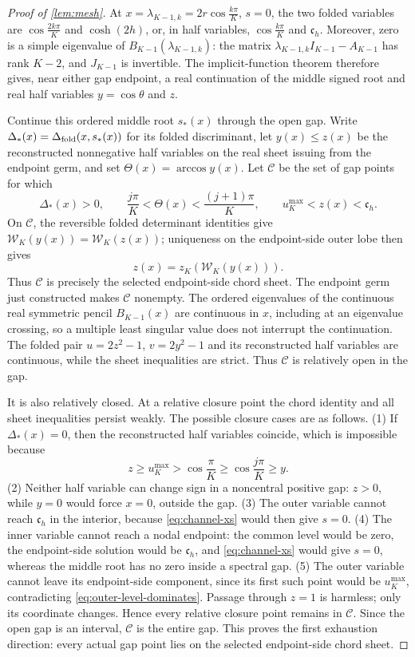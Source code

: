 \documentclass[review,hidelinks,onefignum,onetabnum]{siamart251216}
\begin{document}
\begin{proof}[Proof of \cref{lem:mesh}]
At \(x=\lambda_{K-1,k}=2r\cos\frac{k\pi}{K}\), \(s=0\), the two
folded variables are \(\cos\frac{2k\pi}{K}\) and
\(\cosh(2h)\), or, in half variables, \(\cos\frac{k\pi}{K}\) and
\(\mathfrak c_h\).  Moreover, zero is a simple eigenvalue of
\(B_{K-1}(\lambda_{K-1,k})\): the matrix
\(\lambda_{K-1,k}I_{K-1}-A_{K-1}\) has rank \(K-2\), and \(J_{K-1}\) is
invertible.  The implicit-function theorem therefore gives, near either
gap endpoint, a real continuation of the middle signed root and real
half variables \(y=\cos\theta\) and \(z\).

Continue this ordered middle root \(s_*(x)\) through the open gap.  Write
\(\Delta_*(x)=\Delta_{\rm fold}(x,s_*(x))\) for its folded discriminant,
let \(y(x)\leq z(x)\) be the reconstructed nonnegative half variables on
the real sheet issuing from the endpoint germ, and set
\(\Theta(x)=\arccos y(x)\).  Let \(\mathcal C\) be the set of gap points for
which
\[
 \Delta_*(x)>0,\qquad
 \frac{j\pi}{K}<\Theta(x)<\frac{(j+1)\pi}{K},\qquad
 u_K^{\max}<z(x)<\mathfrak c_h.
\]
On \(\mathcal C\), the reversible folded determinant identities give
\(\mathcal W_K(y(x))=\mathcal W_K(z(x))\); uniqueness on the endpoint-side
outer lobe then gives
\[
 z(x)=z_K(\mathcal W_K(y(x))).
\]
Thus \(\mathcal C\) is precisely the selected endpoint-side chord sheet.
The endpoint germ just constructed makes \(\mathcal C\) nonempty.  The
ordered eigenvalues of the continuous real symmetric pencil \(B_{K-1}(x)\)
are continuous in \(x\), including at an eigenvalue crossing, so a multiple
least singular value does not interrupt the continuation.  The folded pair
\(u=2z^2-1\), \(v=2y^2-1\) and its reconstructed half variables are
continuous, while the sheet inequalities are strict.  Thus \(\mathcal C\)
is relatively open in the gap.

It is also relatively closed.  At a relative closure point the chord
identity and all sheet inequalities persist weakly.  The possible closure
cases are as follows.  (1) If \(\Delta_*(x)=0\), then the reconstructed half
variables coincide, which is impossible because
\[
 z\geq u_K^{\max}>\cos\frac{\pi}{K}
 \geq\cos\frac{j\pi}{K}\geq y.
\]
(2) Neither half variable can change sign in a noncentral positive gap:
\(z>0\), while \(y=0\) would force \(x=0\), outside the gap.  (3) The outer
variable cannot reach \(\mathfrak c_h\) in the interior, because
\eqref{eq:channel-xs} would then give \(s=0\).  (4) The inner variable cannot
reach a nodal endpoint: the common level would be zero, the endpoint-side
solution would be \(\mathfrak c_h\), and \eqref{eq:channel-xs} would give
\(s=0\), whereas the middle root has no zero inside a spectral gap.  (5) The
outer variable cannot leave its endpoint-side component, since
its first such point would be \(u_K^{\max}\), contradicting
\eqref{eq:outer-level-dominates}.  Passage through \(z=1\) is harmless; only
its coordinate changes.  Hence every relative closure point remains in
\(\mathcal C\).  Since the open gap is an interval, \(\mathcal C\) is the
entire gap.  This proves the first exhaustion direction: every actual gap
point lies on the selected endpoint-side chord sheet.


\end{proof}
\end{document}
